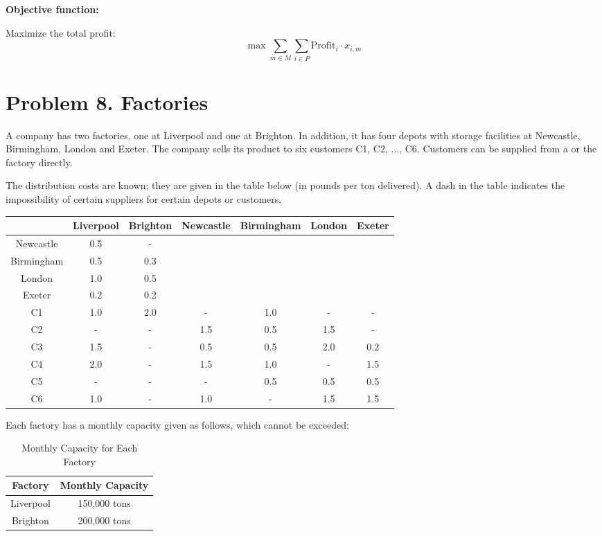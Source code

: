 \documentclass[a4paper,10pt]{article}
\begin{document}
\textbf{Objective function:} 

Maximize the total profit:
\[\max \sum_{m \in M} \sum_{i \in P} \text{Profit}_i \cdot x_{i,m}\]

\newpage

\section*{Problem 8. Factories}

A company has two factories, one at Liverpool and one at Brighton. In addition, it has four depots with storage facilities at Newcastle, Birmingham, London and Exeter. The company sells its product to six customers C1, C2, ..., C6. Customers can be supplied from a or
the factory directly.

The distribution costs are known; they are given in the table below (in pounds per ton delivered). A dash in the table indicates the impossibility of certain suppliers for certain depots or customers.

\begin{center}
\begin{tabular}{|c|c|c|c|c|c|c|}
\hline
& Liverpool & Brighton & Newcastle & Birmingham & London & Exeter\\
\hline
Newcastle & 0.5 & - &&&& \\
Birmingham & 0.5 & 0.3 &&&& \\
London & 1.0 & 0.5 &&&& \\
Exeter & 0.2 & 0.2 &&&& \\
\hline
C1 & 1.0 & 2.0 & - & 1.0 & - & - \\
C2 & - & - & 1.5 & 0.5 & 1.5 & - \\
C3 & 1.5 & - & 0.5 & 0.5 & 2.0 & 0.2 \\
C4 & 2.0 & - & 1.5 & 1.0 & - & 1.5 \\
C5 & - & - & - & 0.5 & 0.5 & 0.5 \\
C6 & 1.0 & - & 1.0 & - & 1.5 & 1.5 \\
\hline
\end{tabular}
\end{center}

Each factory has a monthly capacity given as follows, which cannot be exceeded:
\begin{table}[H]
\centering
\begin{tabular}{|c|c|}
\hline
Factory & Monthly Capacity \\ 
\hline
Liverpool & 150,000 tons \\ 
Brighton & 200,000 tons \\ 
\hline
\end{tabular}
\caption{Monthly Capacity for Each Factory}
\end{table}
\end{document}

